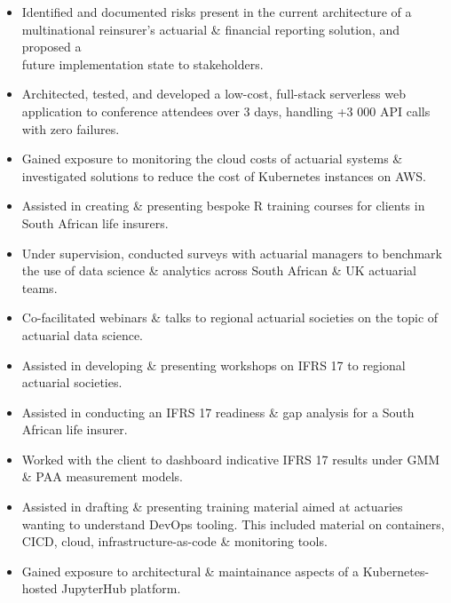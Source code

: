 \documentclass[10pt,a4paper,ragged2e,withhyper]{altacv}
\begin{document}
\begin{paracol}{2}
  \begin{itemize}[label=$\circ$, leftmargin=0.9cm, labelsep=0.43cm]
    \item Identified and documented risks present in the current architecture of a multinational reinsurer's actuarial \& financial reporting solution, and proposed a\\ future implementation state to stakeholders.
    \item Architected, tested, and developed a low-cost, full-stack serverless web \\application to conference attendees over 3 days, handling +3 000 API calls with zero failures.
    \item Gained exposure to monitoring the cloud costs of actuarial systems \& \\investigated solutions to reduce the cost of Kubernetes instances on AWS. 
  \end{itemize}

  \medskip 
  \smallskip
  \begin{itemize}[label=$\circ$, leftmargin=0.9cm, labelsep=0.43cm]
    \item Assisted in creating \& presenting bespoke R training courses for clients in South African life insurers.
    \item Under supervision, conducted surveys with actuarial managers to benchmark the use of data science \& analytics across South African \& UK actuarial teams. 
    \item Co-facilitated webinars \& talks to regional actuarial societies on the topic of actuarial data science. 
  \end{itemize}

  \begin{itemize}[label=$\circ$, leftmargin=0.9cm, labelsep=0.43cm]
    \item Assisted in developing \& presenting workshops on IFRS 17 to regional \\actuarial societies. 
    \item Assisted in conducting an IFRS 17 readiness \& gap analysis for a South African life insurer. 
    \item Worked with the client to dashboard indicative IFRS 17 results under GMM \& PAA measurement models. 
  \end{itemize}

  \begin{itemize}[label=$\circ$, leftmargin=0.9cm, labelsep=0.43cm]
    \item Assisted in drafting \& presenting training material aimed at actuaries wanting to understand DevOps tooling. This included material on containers, CICD, cloud, infrastructure-as-code \& monitoring tools. 
    \item Gained exposure to architectural \& maintainance aspects of a Kubernetes-hosted JupyterHub platform. 
  \end{itemize}


\end{paracol}
\end{document}
